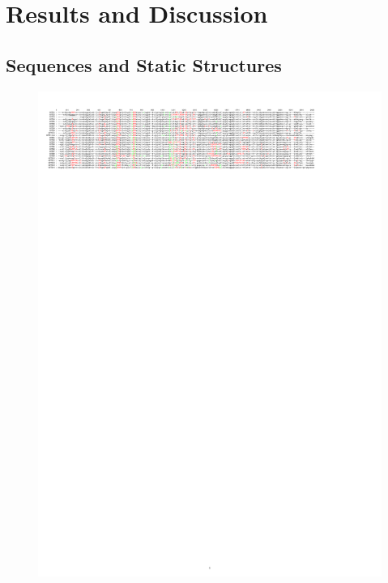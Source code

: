 \chapter{Results and Discussion}

\section{Sequences and Static Structures}
\begin{figure}[h!]
	\label{MSA + RMSDs}
	\includegraphics[width = .99\textwidth]{figures/fig3-1-1}\\[.5cm]
	\begin{minipage}{.32\linewidth}

\end{minipage}
\end{figure}
